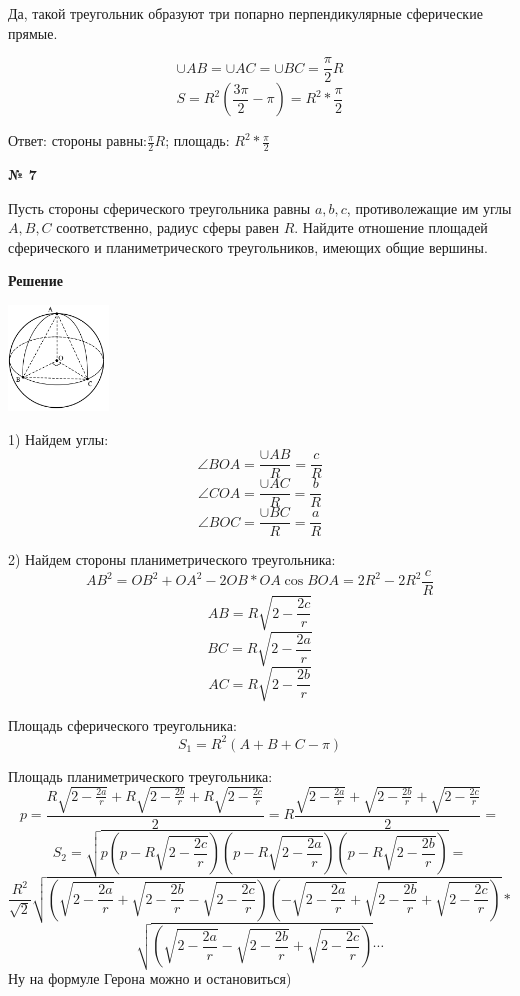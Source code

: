     Да, такой треугольник образуют три попарно перпендикулярные сферические прямые.

    \[
        \cup AB = \cup AC = \cup BC = \frac{\pi}{2}R
    \]
    \[
        S = R^2\left(\frac{3\pi}{2} - \pi\right) = R^2 * \frac{\pi}{2}
    \]

    Ответ: стороны равны:$\frac{\pi}{2}R$; площадь: $R^2 * \frac{\pi}{2}$

    \begin{center}
        \textbf{№ 7}
    \end{center}

    Пусть стороны сферического треугольника равны $a, b, c$, противолежащие им углы $A, B, C$ соответственно, радиус сферы равен $R$.
    Найдите отношение площадей сферического и планиметрического треугольников, имеющих общие вершины.

     \textbf{Решение}\\

    \begin{center}
        \includegraphics[width=0.2\textwidth]{images/img7}\\
    \end{center}

    1) Найдем углы:
    \[
        \angle BOA = \frac{\cup AB}{R} = \frac{c}{R}
    \]
    \[
        \angle COA = \frac{\cup AC}{R} = \frac{b}{R}
    \]
    \[
        \angle BOC = \frac{\cup BC}{R} = \frac{a}{R}
    \]

    2) Найдем стороны планиметрического треугольника:
    \[
        AB^2 = OB ^ 2 + OA ^ 2 - 2 OB * OA \cos BOA = 2R^2 - 2R^2 \frac{c}{R}
    \]
    \[
        AB = R\sqrt {2-\frac{2c}{r}}
    \]
    \[
        BC =  R\sqrt {2-\frac{2a}{r}}
    \]
    \[
        AC =  R\sqrt {2-\frac{2b}{r}}
    \]

    Площадь сферического треугольника:
    \[
        S_1 = R^2(A +B +C - \pi)
    \]

    Площадь планиметрического треугольника:
    \[
        p = \frac{R\sqrt {2-\frac{2a}{r}} + R\sqrt {2-\frac{2b}{r}} + R\sqrt {2-\frac{2c}{r}}}{2} =
        R\frac{\sqrt {2-\frac{2a}{r}} + \sqrt {2-\frac{2b}{r}} + \sqrt {2-\frac{2c}{r}}}{2} =
    \]
    \[
        S_2 = \sqrt{p\left(p- R\sqrt {2-\frac{2c}{r}}\right)\left(p-R\sqrt {2-\frac{2a}{r}}\right)\left(p-R\sqrt {2-\frac{2b}{r}}\right)} =
    \]
    \[
        \frac{R^2}{\sqrt {2}}\sqrt {\left(\sqrt {2-\frac{2a}{r}} + \sqrt {2-\frac{2b}{r}} - \sqrt {2-\frac{2c}{r}}\right)\left(-\sqrt {2-\frac{2a}{r}} + \sqrt {2-\frac{2b}{r}} + \sqrt {2-\frac{2c}{r}}\right)} *
    \]
    \[
        \sqrt{\left(\sqrt {2-\frac{2a}{r}} - \sqrt {2-\frac{2b}{r}} + \sqrt {2-\frac{2c}{r}}\right)}\cdots
    \]
    Ну на формуле Герона можно и остановиться)

